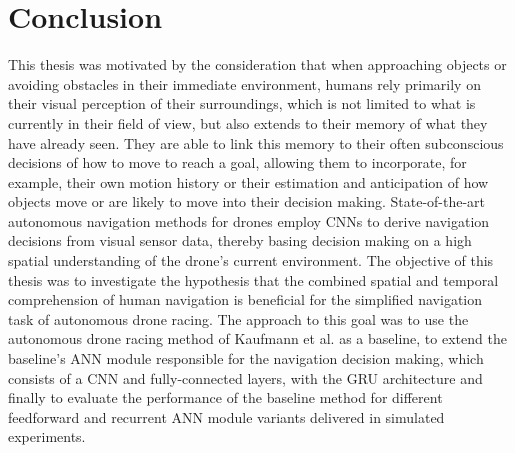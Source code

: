 \section{Conclusion}
This thesis was motivated by the consideration that when
approaching objects or avoiding obstacles in their immediate environment,
humans rely primarily on their visual perception of their surroundings, 
which is not limited to what is currently in their field of view, 
but also extends to their memory of what they have already seen.
They are able to link this memory to their often subconscious
decisions of how to move to reach a goal,
allowing them to incorporate, for example, 
their own motion history or their estimation and anticipation of how objects move or are likely to move
into their decision making.
State-of-the-art autonomous navigation methods for drones 
employ CNNs to derive navigation decisions from visual sensor data,
thereby basing decision making on a high spatial understanding of the drone's current environment.
The objective of this thesis was to investigate the hypothesis
that the combined spatial and temporal comprehension of human navigation
is beneficial for the simplified navigation task of autonomous drone racing.
The approach to this goal was 
to use the autonomous drone racing method of Kaufmann et al. \cite{Kaufmann2018} as a baseline,
to extend the baseline's ANN module responsible for the navigation decision making,
which consists of a CNN and fully-connected layers,
with the GRU architecture
and finally to evaluate the performance 
of the baseline method for different feedforward and recurrent ANN module variants delivered in simulated experiments.


